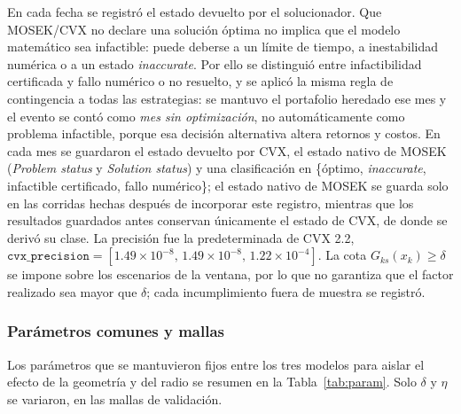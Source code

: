 En cada fecha se registró el estado devuelto por el solucionador. Que MOSEK/CVX no declare una solución óptima no implica que el modelo matemático sea infactible: puede deberse a un límite de tiempo, a inestabilidad numérica o a un estado \emph{inaccurate}. Por ello se distinguió entre infactibilidad certificada y fallo numérico o no resuelto, y se aplicó la misma regla de contingencia a todas las estrategias: se mantuvo el portafolio heredado ese mes y el evento se contó como \emph{mes sin optimización}, no automáticamente como problema infactible, porque esa decisión alternativa altera retornos y costos.
En cada mes se guardaron el estado devuelto por CVX, el estado nativo de MOSEK (\emph{Problem status} y \emph{Solution status}) y una clasificación en \{óptimo, \emph{inaccurate}, infactible certificado, fallo numérico\}; el estado nativo de MOSEK se guarda solo en las corridas hechas después de incorporar este registro, mientras que los resultados guardados antes conservan únicamente el estado de CVX, de donde se derivó su clase. La precisión fue la predeterminada de CVX 2.2, $\texttt{cvx\_precision}=[1.49\times10^{-8},\,1.49\times10^{-8},\,1.22\times10^{-4}]$.
 La cota $G_{ks}(x_k)\ge\delta$ se impone sobre los escenarios de la ventana, por lo que no garantiza que el factor realizado sea mayor que $\delta$; cada incumplimiento fuera de muestra se registró.

\subsubsection{Parámetros comunes y mallas}

Los parámetros que se mantuvieron fijos entre los tres modelos para aislar el efecto de la geometría y del radio se resumen en la Tabla~\ref{tab:param}. Solo $\delta$ y $\eta$ se variaron, en las mallas de validación.

